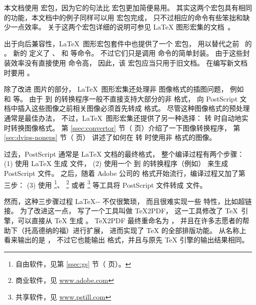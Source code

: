 本文档使用  宏包，因为它的句法比  宏包更加简便易用。
其实这两个宏包具有相同的功能，本文档中的例子同样可以用  宏包完成，
只不过相应的命令有些笨拙和缺少一点效率。
关于这两个宏包详细的说明可参见 \LaTeX{} 图形宏集的文档~\cite{grfguide}。

出于向后兼容性，\LaTeX\ 图形宏包套件中也提供了一个  宏包，
用以替代之前 \LaTeXe\ 的 。
新的 定义了 、 和  等命令。
不过它们只是调用  命令的简单封装。
由于这些封装效率没有直接使用  命令高，
因此，该  宏包应当只用于旧文档。
在编写新文档时要用 。

除了改进  图片的部分，
\LaTeX{}~图形宏集还处理非  图像格式的插图问题，
例如 和 等。
由于  到  的转换程序一般不直接支持大部分的非 格式，
向 PostScript 文档中插入这些图像之前相关图像必须首先转成  格式。
尽管这种图像格式的预处理通常是最佳办法，
不过，\LaTeX\ 图形宏集还提供了另一种选择： 转  时自动地实时转换图像格式。
第 \ref{ssec:convertor} 节（\pageref{ssec:convertor} 页）介绍了一下图像转换程序，
第 \ref{sec:dvips-noneps} 节（\pageref{sec:dvips-noneps} 页） 讲述了如何在  转  时使用非  格式的图像。

过去，PostScript 通常是 \LaTeX{} 文档的最终格式，
\marginpar{\pdfTeX}
整个编译过程有两个步骤：
(1) 使用 \LaTeX{} 生成  文件，
(2) 使用一个  到  的转换程序（例如） 来生成 PostScript 文件。
之后，随着 Adobe 公司的  格式开始流行，编译过程又加了第三步：
(3) 使用 \footnote{
    自由软件，见第 \ref{ssec:gs} 节（\pageref{ssec:gs} 页）。}、
\footnote{
    商业软件，见 \url{www.adobe.com}}
或者 \footnote{
    共享软件，见 \url{www.pstill.com}}
等工具将 PostScript 文件转成  文件。

然而，这种三步骤过程 \LaTeX-- 不仅很繁琐，
而且很难实现一些  特性，比如超链接。
为了改进这一点，\HanTheThanh{} 写了一个工具叫做 \TeX2PDF，
这一工具修改了 \TeX\ 引擎，可以直接从 \TeX{} 生成 。
\TeX2PDF 最终重命名为 \pdfTeX，
并且在许多志愿者的帮助下（托高德纳的福）进行扩展，
进而实现了 \TeX{} 的全部排版功能。
\pdfTeX 从名称上看来输出的是 ，
不过它也能输出  格式，并且与原先 \TeX{} 引擎的输出结果相同。


